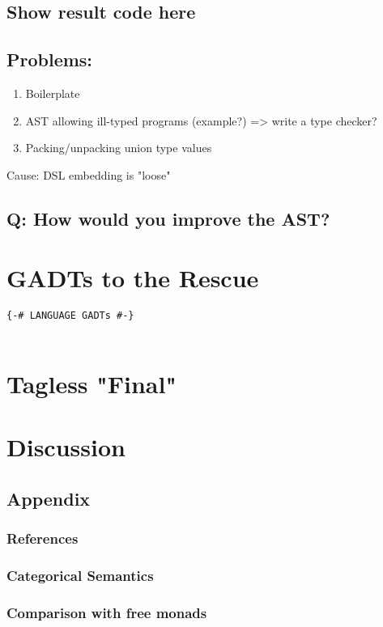 \documentclass[11pt]{article}
\begin{document}
\subsection*{Show result code here}
\label{sec:org5253f52}

\subsection*{Problems:}
\label{sec:orga76e73b}
\begin{enumerate}
\item Boilerplate
\item AST allowing ill-typed programs (example?)
=> write a type checker?
\item Packing/unpacking union type values
\end{enumerate}

Cause: DSL embedding is "loose" 

\subsection*{Q: How would you improve the AST?}
\label{sec:org0b48500}

\section*{GADTs to the Rescue}
\label{sec:org6e3214b}
\begin{verbatim}
{-# LANGUAGE GADTs #-}


\end{verbatim}

\section*{Tagless "Final"}
\label{sec:orgc8b73c8}

\section*{Discussion}
\label{sec:org43335eb}

\subsection*{Appendix}
\label{sec:org62f163c}

\subsubsection*{References}
\label{sec:orgb3038eb}

\subsubsection*{Categorical Semantics}
\label{sec:org1742e3f}

\subsubsection*{Comparison with free monads}
\label{sec:org720c5a1}
\end{document}
